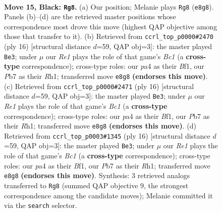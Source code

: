 \documentclass[11pt]{article}
\begin{document}
\begin{figure}[p]\centering
\begin{subfigure}{0.46\textwidth}\centering
\resizebox{\linewidth}{!}{%
\newchessgame
\chessboard[
  setfen={rnb1r3/1p3ppp/1k2pn2/pNb5/P6P/1B2P3/1P1B1PP1/RN1R2K1 b - - 8 15},
  showmover=false,
  pgfstyle=straightmove, color=movearrow, markmove={e8-g8}
]}
\caption{}
\end{subfigure}\hfill
\begin{subfigure}{0.46\textwidth}\centering
\resizebox{\linewidth}{!}{%
\newchessgame
\chessboard[
  setfen={rnbr2k1/ppp2pbp/5np1/4p3/2P1P3/2N2N1P/PP3PP1/R1B1KB1R w KQ - 0 9},
  showmover=false,
  pgfstyle=straightmove, color=movearrow, markmove={c1-e3}
]}
\caption{}
\end{subfigure}
\\[4pt]
\begin{subfigure}{0.46\textwidth}\centering
\resizebox{\linewidth}{!}{%
\newchessgame
\chessboard[
  setfen={rnbr2k1/ppp2pbp/5np1/4p3/2P1P3/2N2N1P/PP3PP1/R1B1KB1R w KQ - 0 9},
  showmover=false,
  pgfstyle=straightmove, color=movearrow, markmove={c1-e3}
]}
\caption{}
\end{subfigure}\hfill
\begin{subfigure}{0.46\textwidth}\centering
\resizebox{\linewidth}{!}{%
\newchessgame
\chessboard[
  setfen={rnbr2k1/ppp2pbp/5np1/4p3/2P1P3/2N2N1P/PP3PP1/R1B1KB1R w KQ - 0 9},
  showmover=false,
  pgfstyle=straightmove, color=movearrow, markmove={c1-e3}
]}
\caption{}
\end{subfigure}
\caption{\textbf{Move 15, Black: \texttt{Rg8}.} (a) Our position; Melanie plays \texttt{Rg8} (\texttt{e8g8}). Panels (b)--(d) are the retrieved master positions whose correspondence most drove this move (highest QAP objective among those that transfer to it). (b) Retrieved from \texttt{ccrl\_top\_p0000\#2470} (ply 16) [structural distance $d$=59, QAP obj=3]: the master played \texttt{Be3}; under $\mu$ our \emph{Re1} plays the role of that game's \emph{Bc1} (a \textbf{cross-type} correspondence); cross-type roles: our \emph{p}a4 as their \emph{B}f1, our \emph{P}b7 as their \emph{R}h1; transferred move \texttt{e8g8} \textbf{(endorses this move)}. (c) Retrieved from \texttt{ccrl\_top\_p0000\#2471} (ply 16) [structural distance $d$=59, QAP obj=3]: the master played \texttt{Be3}; under $\mu$ our \emph{Re1} plays the role of that game's \emph{Bc1} (a \textbf{cross-type} correspondence); cross-type roles: our \emph{p}a4 as their \emph{B}f1, our \emph{P}b7 as their \emph{R}h1; transferred move \texttt{e8g8} \textbf{(endorses this move)}. (d) Retrieved from \texttt{ccrl\_top\_p0003\#1345} (ply 16) [structural distance $d$=59, QAP obj=3]: the master played \texttt{Be3}; under $\mu$ our \emph{Re1} plays the role of that game's \emph{Bc1} (a \textbf{cross-type} correspondence); cross-type roles: our \emph{p}a4 as their \emph{B}f1, our \emph{P}b7 as their \emph{R}h1; transferred move \texttt{e8g8} \textbf{(endorses this move)}. Synthesis: 3 retrieved analogs transferred to \texttt{Rg8} (summed QAP objective 9, the strongest correspondence among the candidate moves); Melanie committed it via the \texttt{search} selector.}
\label{fig:thought-m29}
\end{figure}
\end{document}
